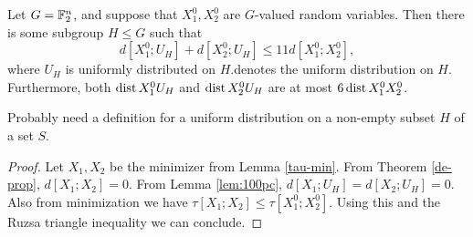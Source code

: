 \begin{theorem}\label{entropy-pfr}
  Let $G = \mathbb{F}_2^n$, and suppose that $X^0_1, X^0_2$ are $G$-valued random variables.
  Then there is some subgroup $H \leq G$ such that
  \[
    d[X^0_1;U_H] + d[X^0_2;U_H] \le 11 d[X^0_1;X^0_2],
  \]
  where $U_H$ is uniformly distributed on $H$.denotes the uniform distribution on $H$.
  Furthermore, both $\operatorname{dist}{X^0_1}{U_H}$ and $\operatorname{dist}{X^0_2}{U_H}$ are at most $6 \operatorname{dist}{X^0_1}{X^0_2}$.
\end{theorem}

Probably need a definition for a uniform distribution on a non-empty subset $H$ of a set $S$.

\begin{proof}   Let $X_1, X_2$ be the minimizer from Lemma \ref{tau-min}.  From Theorem \ref{de-prop}, $d[X_1;X_2]=0$.  From Lemma \ref{lem:100pc}, $d[X_1;U_H] = d[X_2; U_H] = 0$.  Also from minimization we have $\tau[X_1;X_2] \leq \tau[X^0_1;X^0_2]$.  Using this and the Ruzsa triangle inequality we can conclude.
\end{proof}
